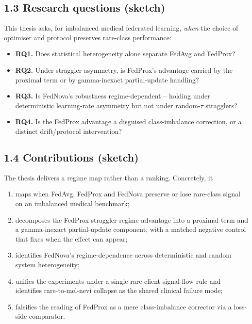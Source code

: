 \subsection*{1.3 Research questions (sketch)}
This thesis asks, for imbalanced medical federated learning, \emph{when} the
choice of optimiser and protocol preserves rare-class performance:
\begin{itemize}
  \item \textbf{RQ1.} Does statistical heterogeneity alone separate FedAvg and
        FedProx?
  \item \textbf{RQ2.} Under straggler asymmetry, is FedProx's advantage carried
        by the proximal term or by gamma-inexact partial-update handling?
  \item \textbf{RQ3.} Is FedNova's robustness regime-dependent -- holding under
        deterministic learning-rate asymmetry but not under random-$\tau$
        stragglers?
  \item \textbf{RQ4.} Is the FedProx advantage a disguised class-imbalance
        correction, or a distinct drift/protocol intervention?
\end{itemize}


\subsection*{1.4 Contributions (sketch)}
The thesis delivers a regime map rather than a ranking. Concretely, it
\begin{enumerate}
  \item maps when FedAvg, FedProx and FedNova preserve or lose rare-class signal
        on an imbalanced medical benchmark;
  \item decomposes the FedProx straggler-regime advantage into a proximal-term
        and a gamma-inexact partial-update component, with a matched negative
        control that fixes when the effect can appear;
  \item identifies FedNova's regime-dependence across deterministic and random
        system heterogeneity;
  \item unifies the experiments under a single rare-client signal-flow rule and
        identifies rare-to-mel-nevi collapse as the shared clinical failure mode;
  \item falsifies the reading of FedProx as a mere class-imbalance corrector via
        a loss-side comparator.
\end{enumerate}


